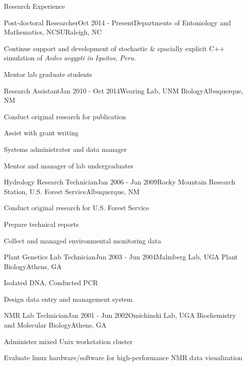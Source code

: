 \documentclass{resume} %
\begin{document}
\begin{rSection}{Research Experience}

\begin{rSubsection}{Post-doctoral Researcher}{Oct 2014 - Present}{Departments of
Entomology and Mathematics,  NCSU}{Raleigh, NC}
\item Continue support and development of stochastic \& spacially explicit
C++ simulation of \em{Aedes aegypti} in Iquitos, Peru.
\item Mentor lab graduate students
\end{rSubsection}

\begin{rSubsection}{Research Assistant}{Jan 2010 - Oct 2014}{Wearing Lab, UNM Biology}{Albuquerque, NM}
\item Conduct original research for publication
\item Assist with grant writing
\item Systems administrator and data manager
\item Mentor and manager of lab undergraduates
\end{rSubsection}


\begin{rSubsection}{Hydrology Research Technician}{Jan 2006 - Jan 2009}{Rocky
Mountain Research Station, U.S. Forest Service}{Albuquerque, NM}
\item Conduct original research for U.S. Forest Service
\item Prepare technical reports
\item Collect and managed environmental monitoring data 
\end{rSubsection}

\begin{rSubsection}{Plant Genetics Lab Technician}{Jun 2003 - Jun 2004}{Malmberg Lab, UGA Plant Biology}{Athens, GA}
\item Isolated DNA, Conducted PCR
\item Design data entry and management system
\end{rSubsection}

\begin{rSubsection}{NMR Lab Technician}{Jan 2001 - Jun 2002}{Omichinski Lab, UGA
Biochemistry and Molecular Biology}{Athens, GA}
\item Administer mixed Unix workstation cluster
\item Evaluate linux hardware/software for high-performance NMR data
visualization
\end{rSubsection}
\end{rSection}
\end{document}

